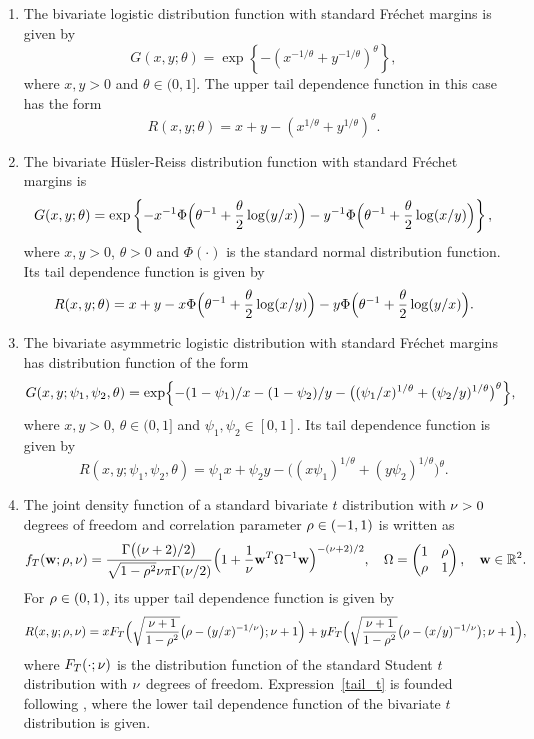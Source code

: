 \begin{enumerate}[label=(\arabic*)]
    \item The bivariate logistic distribution function with standard Fr\'echet margins is given by
    $$G(x,y;\theta) = \exp\left\{-(x^{-1/\theta}+y^{-1/\theta})^\theta\right\},$$
    where $x, y>0$ and $\theta \in (0,1]$. The upper tail dependence function in this case has the form
\begin{equation}\label{tail_log}
R(x,y;\theta) = x + y - (x^{1/\theta}+y^{1/\theta})^{\theta}.
\end{equation}
    
    \item The bivariate H\"{u}sler-Reiss distribution function with standard Fr\'echet margins is
    $$G(x,y;\theta) = \exp\left\{-x^{-1}\Phi\Bigl(\theta^{-1}+\frac{\theta}{2}\log(y/x)\Bigr)-y^{-1}\Phi\Bigl(\theta^{-1}+\frac{\theta}{2}\log(x/y)\Bigr)\right\},$$
    where $x, y>0$, $\theta >0$ and $\Phi(\cdot)$ is the standard normal distribution function. Its tail dependence function is given by
\begin{equation}\label{tail_hr}
R(x,y;\theta) = x + y - x\Phi\Bigl(\theta^{-1}+\frac{\theta}{2}\log(x/y)\Bigr)-y\Phi\Bigl(\theta^{-1}+\frac{\theta}{2}\log(y/x)\Bigr).
\end{equation}


    \item The bivariate asymmetric logistic distribution with standard Fr\'echet margins has distribution function of the form
$$
 G(x,y;\psi_1,\psi_2,\theta) = \exp\Bigl\{-(1-\psi_1)/x-(1-\psi_2)/y- \bigl((\psi_1/x)^{1/\theta}+(\psi_2/y)^{1/\theta}\bigr)^\theta\Bigr\},
$$
where $x,y>0$, $\theta\in(0,1]$ and $\psi_1,\psi_2\in [0,1]$. Its tail dependence function is given by
\begin{equation}\label{tail_alog}
R(x,y;\psi_1,\psi_2,\theta)=\psi_1x+\psi_2y-\bigl((x\psi_1)^{1/\theta}+(y\psi_2)^{1/\theta}\bigr)^{\theta}.
\end{equation}
    
    \item The joint density function of a standard bivariate $t$ distribution with $\nu>0$ degrees of freedom and correlation parameter $\rho\in(-1,1)$ is written as
$$
 f_{T}({\mathbf w};\rho,\nu) = \dfrac{\Gamma\bigl((\nu+2)/2\bigr)}{\sqrt{1-\rho^2}\nu\pi\Gamma(\nu/2)}\Bigl(1+\dfrac{1}{\nu}{\mathbf w}^T\Omega^{-1}{\mathbf w}\Bigr)^{-(\nu+2)/2},\quad \Omega=\begin{pmatrix} 1 & \rho\\ \rho & 1 \end{pmatrix},\quad {\mathbf w}\in{\mathbb R}^2.
 $$
For $\rho\in(0,1)$, its upper tail dependence function is given by
\begin{equation}\label{tail_t}R(x,y;\rho,\nu)=xF_{T}\Bigl(\sqrt{\frac{\nu+1}{1-\rho^2}}\bigl(\rho-(y/x)^{-1/\nu}\bigr);\nu+1 \Bigr)+yF_{T}\Bigl(\sqrt{\frac{\nu+1}{1-\rho^2}}\bigl(\rho-(x/y)^{-1/\nu}\bigr);\nu+1 \Bigr), 
\end{equation}
where $F_T(\cdot;\nu)$ is the distribution function of the standard Student $t$ distribution with $\nu$ degrees of freedom. Expression~\eqref{tail_t} is founded following \cite{DemartaMcNeil2005}, where the lower tail dependence function of the bivariate $t$ distribution is given.

\end{enumerate}

